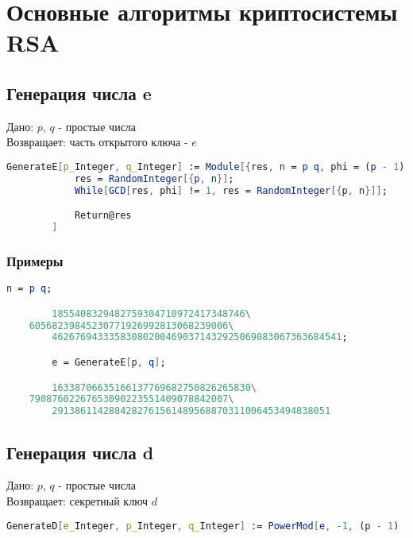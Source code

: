 
\chapter{Основные алгоритмы криптосистемы RSA}

	\section{Генерация числа e}
		Дано: $p$, $q$ - простые числа \\
		Возвращает: часть открытого ключа - $e$

		\begin{lstlisting}[language=Mathematica,caption={
      		Генерация числа e	
    	}]
		GenerateE[p_Integer, q_Integer] := Module[{res, n = p q, phi = (p - 1) (q - 1)}, 
			res = RandomInteger[{p, n}]; 
			While[GCD[res, phi] != 1, res = RandomInteger[{p, n}]];

			Return@res
		]
    	\end{lstlisting}

    	\subsection{Примеры}

    	\begin{lstlisting}[language=Mathematica,caption={
      		Пример	
    	}]
		n = p q;

		1855408329482759304710972417348746\
    60568239845230771926992813068239006\
		462676943335830802004690371432925069083067363684541;

		e = GenerateE[p, q];

		16338706635166137769682750826265830\
    79087602267653090223551409078842007\
		2913861142884282761561489568870311006453494838051
    	\end{lstlisting}

	\section{Генерация числа d}
		Дано: $p$, $q$ - простые числа \\
		Возвращает: секретный ключ $d$

		\begin{lstlisting}[language=Mathematica,caption={
      		Генерация числа d	
    	}]
    	GenerateD[e_Integer, p_Integer, q_Integer] := PowerMod[e, -1, (p - 1) (q - 1)]
    	\end{lstlisting}

